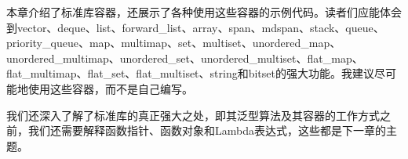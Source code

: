 本章介绍了标准库容器，还展示了各种使用这些容器的示例代码。读者们应能体会到vector、deque、list、forward\_list、array、span、mdspan、stack、queue、priority\_queue、map、multimap、set、multiset、unordered\_map、unordered\_multimap、unordered\_set、unordered\_multiset、flat\_map、flat\_multimap、flat\_set、flat\_multiset、string和bitset的强大功能。我建议尽可能地使用这些容器，而不是自己编写。

我们还深入了解了标准库的真正强大之处，即其泛型算法及其容器的工作方式之前，我们还需要解释函数指针、函数对象和Lambda表达式，这些都是下一章的主题。